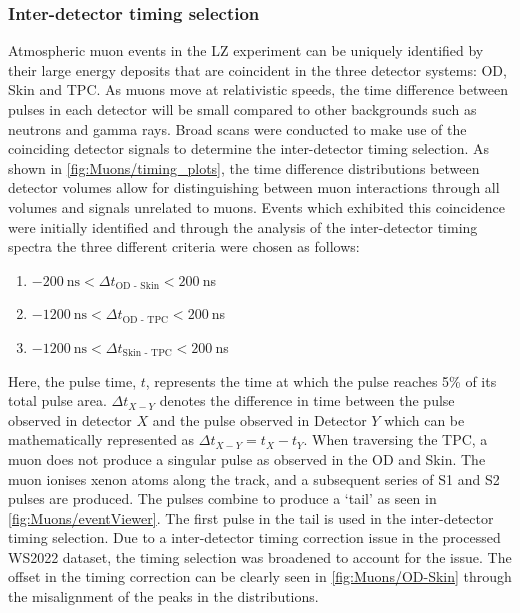 \subsubsection{Inter-detector timing selection}\label{sec:Muons/MuonFluxTimingSelection}
Atmospheric muon events in the LZ experiment can be uniquely identified by their large energy deposits that are coincident in the three detector systems: OD, Skin and TPC. As muons move at relativistic speeds, the time difference between pulses in each detector will be small compared to other backgrounds such as neutrons and gamma rays.
Broad scans were conducted to make use of the coinciding detector signals to determine the inter-detector timing selection. As shown in \autoref{fig:Muons/timing_plots}, the time difference distributions between detector volumes allow for distinguishing between muon interactions through all volumes and signals unrelated to muons. Events which exhibited this coincidence were initially identified and through the analysis of the inter-detector timing spectra the three different criteria were chosen as follows:
 \begin{enumerate}
    \item $-200~\text{ns} < \Delta t_{\text{OD - Skin}} < 200~$ns
    \item $-1200~\text{ns} < \Delta t_{\text{OD - TPC}} < 200~$ns
    \item $-1200~\text{ns} < \Delta t_{\text{Skin - TPC}} < 200~$ns
\end{enumerate}
Here, the pulse time, $t$, represents the time at which the pulse reaches 5\% of its total pulse area. $\Delta t_{X-Y}$ denotes the difference in time between the pulse observed in detector $X$ and the pulse observed in Detector $Y$ which can be mathematically represented as $\Delta t_{X-Y}=t_X-t_Y$. When traversing the TPC, a muon does not produce a singular pulse as observed in the OD and Skin. The muon ionises xenon atoms along the track, and a subsequent series of S1 and S2 pulses are produced. The pulses combine to produce a `tail' as seen in \autoref{fig:Muons/eventViewer}. The first pulse in the tail is used in the inter-detector timing selection. Due to a inter-detector timing correction issue in the processed WS2022 dataset, the timing selection was broadened to account for the issue. The offset in the timing correction can be clearly seen in \autoref{fig:Muons/OD-Skin} through the misalignment of the peaks in the distributions.
